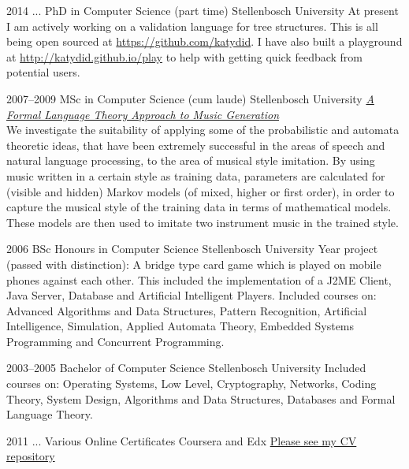 \documentclass[print]{friggeri-cv} %
\begin{document}

\begin{entrylist}

\entry
{2014 ...}
{PhD {\normalfont in Computer Science} (part time)}
{Stellenbosch University}
{At present I am actively working on a validation language for tree structures.
This is all being open sourced at \href{https://github.com/katydid}{https://github.com/katydid}.
I have also built a playground at \href{http://katydid.github.io/play}{http://katydid.github.io/play} to help with getting quick feedback from potential users.}

\entry
{2007--2009}
{MSc {\normalfont in Computer Science} (cum laude)}
{Stellenbosch University}
{\href{http://superwillow.sourceforge.net/}{\emph{A Formal Language Theory Approach to Music Generation}} \\ We investigate the suitability of applying some of the probabilistic and automata theoretic ideas, that have been extremely successful in the areas of speech and natural language processing, to the area of musical style imitation. By using music written in a certain style as training data, parameters are calculated for (visible and hidden) Markov models (of mixed, higher or first order), in order to capture the musical style of the training data in terms of mathematical models. These models are then used to imitate two instrument music in the trained style.}

\end{entrylist}

\begin{entrylist}

\entry
{2006}
{BSc Honours {\normalfont in Computer Science}}
{Stellenbosch University}
{Year project (passed with distinction): A bridge type card game which is played on mobile phones against each other. This included the implementation of a J2ME Client, Java Server, Database and Artificial Intelligent Players.
Included courses on: Advanced Algorithms and Data Structures, Pattern Recognition, Artificial Intelligence, Simulation, Applied Automata Theory, Embedded Systems Programming and Concurrent Programming.}

\entry
{2003--2005}
{Bachelor {\normalfont of Computer Science}}
{Stellenbosch University}
{Included courses on: Operating Systems, Low Level, Cryptography, Networks, Coding Theory, System Design, Algorithms and Data Structures, Databases and Formal Language Theory.}

\entry
{2011 ...}
{Various Online Certificates}
{Coursera and Edx}
{\href{https://github.com/awalterschulze/waltercv}{Please see my CV repository}}

\end{entrylist}
\end{document}
